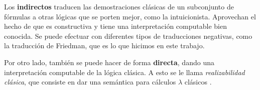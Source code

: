 Los \textbf{indirectos} traducen las demostraciones clásicas de un subconjunto de fórmulas a otras lógicas que se porten mejor, como la intuicionista. Aprovechan el hecho de que es constructiva y tiene una interpretación computable bien conocida. Se puede efectuar con diferentes tipos de traducciones negativas, como la traducción de Friedman, que es lo que hicimos en este trabajo.

Por otro lado, también se puede hacer de forma \textbf{directa}, dando una interpretación computable de la lógica clásica. A esto se le llama \textit{realizabilidad clásica}, que consiste en dar una semántica para cálculos $\lambda$ clásicos \cite{miquel-classical-realiz}.